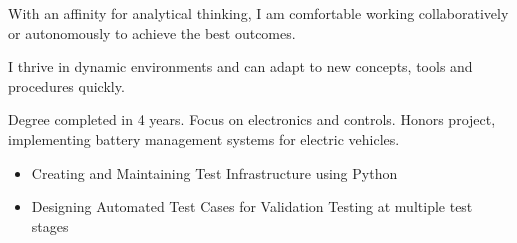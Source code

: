 \documentclass[11pt,a4paper,ragged2e,withhyper]{altacv}
\begin{document}


\makecvheader
{}

\begin{paracol}{2}


  With an affinity for analytical thinking, I am comfortable working collaboratively or autonomously to achieve the best outcomes.

  I thrive in dynamic environments and can adapt to new concepts, tools and procedures quickly.



  \divider\smallskip


  \divider\smallskip

  \divider
  \divider
  \medskip



  Degree completed in 4 years. Focus on electronics and controls. Honors
  project, implementing battery management systems for electric
  vehicles.

  \switchcolumn


  \begin{itemize}
    \item Creating and Maintaining Test Infrastructure using Python
    \item Designing Automated Test Cases for Validation Testing at multiple test stages
  \end{itemize}


\end{paracol}
\end{document}
